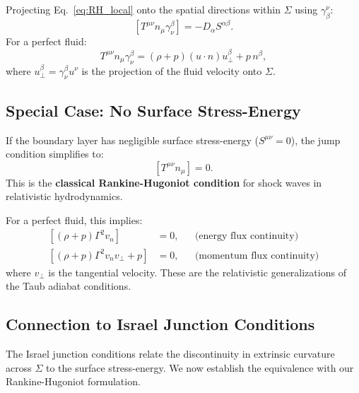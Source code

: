 \begin{proposition}
\label{prop:momentum_jump}
Projecting Eq.~\eqref{eq:RH_local} onto the spatial directions within $\Sigma$ using $\gamma^\nu_\beta$:
\begin{equation}
\label{eq:momentum_jump}
\left[ T^{\mu\nu} n_\mu \gamma^\beta_\nu \right] = -D_\alpha S^{\alpha\beta}.
\end{equation}
For a perfect fluid:
\begin{equation}
\label{eq:momentum_flux}
T^{\mu\nu} n_\mu \gamma^\beta_\nu = (\rho + p)(u \cdot n) u^\beta_{\perp} + p \, n^\beta,
\end{equation}
where $u^\beta_\perp = \gamma^\beta_\nu u^\nu$ is the projection of the fluid velocity onto $\Sigma$.
\end{proposition}

\subsection{Special Case: No Surface Stress-Energy}
\label{app:RH_simple}

If the boundary layer has negligible surface stress-energy ($S^{\mu\nu} = 0$), the jump condition simplifies to:
\begin{equation}
\label{eq:RH_simple_case}
\left[ T^{\mu\nu} n_\mu \right] = 0.
\end{equation}
This is the \textbf{classical Rankine-Hugoniot condition} for shock waves in relativistic hydrodynamics.

For a perfect fluid, this implies:
\begin{align}
\label{eq:classical_RH}
\left[ (\rho + p) \Gamma^2 v_n \right] &= 0, && \text{(energy flux continuity)} \\
\left[ (\rho + p) \Gamma^2 v_n v_\perp + p \right] &= 0, && \text{(momentum flux continuity)}
\end{align}
where $v_\perp$ is the tangential velocity. These are the relativistic generalizations of the Taub adiabat conditions.

\subsection{Connection to Israel Junction Conditions}
\label{app:Israel}

The Israel junction conditions relate the discontinuity in extrinsic curvature across $\Sigma$ to the surface stress-energy. We now establish the equivalence with our Rankine-Hugoniot formulation.

